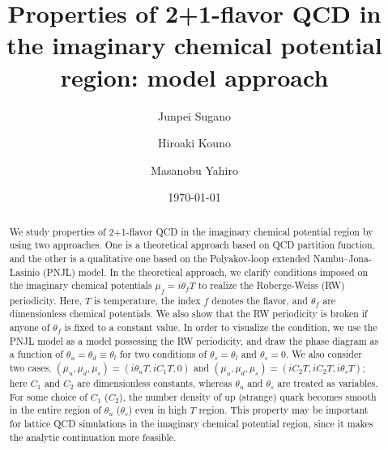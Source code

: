 \documentclass[prd,superscriptaddress,unsortedaddress,
twocolumn,showpacs,preprintnumbers,amsmath,amssymb]{revtex4}
\begin{document}
\title{
Properties of 2+1-flavor QCD in the imaginary chemical potential region: 
model approach
}

\author{Junpei Sugano}

\author{Hiroaki Kouno}

\author{Masanobu Yahiro}

\date{\today}


 \begin{abstract}
  We study properties of 2+1-flavor QCD
  in the imaginary chemical potential region by using two 
  approaches. One is a theoretical approach based on
  QCD partition function,
  and the other is a qualitative one based on
  the Polyakov-loop extended Nambu--Jona-Lasinio (PNJL) model. 
  In the theoretical approach, we clarify conditions imposed on
  the imaginary chemical potentials $\mu_{f}=i\theta_{f}T$
  to realize the Roberge-Weiss (RW) periodicity.
  Here, $T$ is temperature, the index $f$ denotes the flavor,
  and $\theta_{f}$ are dimensionless chemical potentials.
  We also show that the RW periodicity is broken
  if anyone of $\theta_{f}$ is fixed to a constant value.
  In order to visualize the condition, we use the PNJL model 
  as a model possessing the RW periodicity, and  
  draw the phase diagram as a function of $\theta_{u}=\theta_{d}\equiv \theta_{l}$
  for two conditions of $\theta_{s}=\theta_{l}$ and $\theta_{s}=0$. 
  We also consider two cases,
  $(\mu_{u},\mu_{d},\mu_{s}) =(i\theta_{u}T,iC_{1}T,0)$ and
  $(\mu_{u},\mu_{d},\mu_{s})=(iC_{2}T,iC_{2}T,i\theta_{s}T)$;
  here $C_{1}$ and $C_{2}$ are dimensionless constants, whereas 
  $\theta_{u}$ and $\theta_{s}$ are treated as variables.
  For some choice of $C_{1}$ ($C_{2}$),
  the number density of up (strange) quark becomes smooth
  in the entire region of $\theta_{u}$ ($\theta_{s}$)
  even in high $T$ region.
  This property may be important for lattice QCD simulations 
  in the imaginary chemical potential region, 
  since it makes the analytic continuation more feasible.
 \end{abstract}
\end{document}

